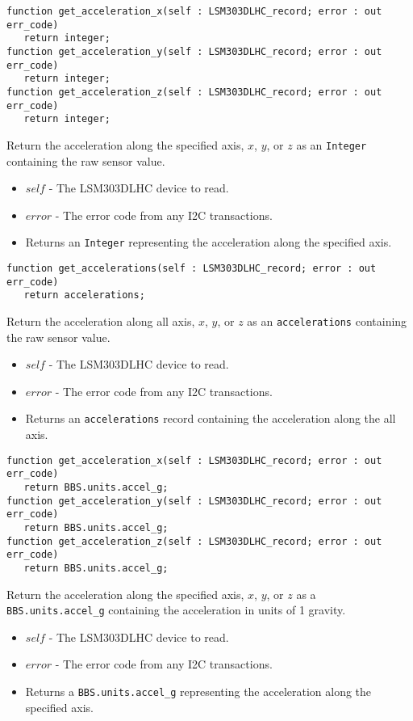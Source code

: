 \documentclass[10pt, openany]{book}
\newcommand{\datatype}[1]{\texttt{#1}}
\begin{document}
\begin{lstlisting}
function get_acceleration_x(self : LSM303DLHC_record; error : out err_code)
   return integer;
function get_acceleration_y(self : LSM303DLHC_record; error : out err_code)
   return integer;
function get_acceleration_z(self : LSM303DLHC_record; error : out err_code)
   return integer;
\end{lstlisting}
Return the acceleration along the specified axis, $x$, $y$, or $z$ as an \datatype{Integer} containing the raw sensor value.
\begin{itemize}
  \item $self$ - The LSM303DLHC device to read.
  \item $error$ - The error code from any I2C transactions.
  \item Returns an \datatype{Integer} representing the acceleration along the specified axis.
\end{itemize}

\begin{lstlisting}
function get_accelerations(self : LSM303DLHC_record; error : out err_code)
   return accelerations;
\end{lstlisting}
Return the acceleration along all axis, $x$, $y$, or $z$ as an \datatype{accelerations} containing the raw sensor value.
\begin{itemize}
  \item $self$ - The LSM303DLHC device to read.
  \item $error$ - The error code from any I2C transactions.
  \item Returns an \datatype{accelerations} record containing the acceleration along the all axis.
\end{itemize}

\begin{lstlisting}
function get_acceleration_x(self : LSM303DLHC_record; error : out err_code)
   return BBS.units.accel_g;
function get_acceleration_y(self : LSM303DLHC_record; error : out err_code)
   return BBS.units.accel_g;
function get_acceleration_z(self : LSM303DLHC_record; error : out err_code)
   return BBS.units.accel_g;
\end{lstlisting}
Return the acceleration along the specified axis, $x$, $y$, or $z$ as a \datatype{BBS.units.accel\_g} containing the acceleration in units of 1 gravity.
\begin{itemize}
  \item $self$ - The LSM303DLHC device to read.
  \item $error$ - The error code from any I2C transactions.
  \item Returns a \datatype{BBS.units.accel\_g} representing the acceleration along the specified axis.
\end{itemize}
\end{document}
